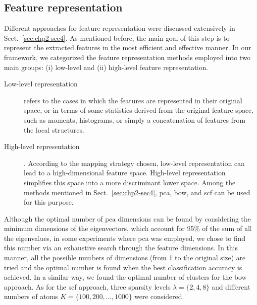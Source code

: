 \subsection{Feature representation}\label{chp3-subsec4}
Different approaches for feature representation were discussed extensively in Sect.~\ref{sec:chp2-sec4}.
As mentioned before, the main goal of this step is to represent the extracted features in the most efficient and effective manner.
In our framework, we categorized the feature representation methods employed into two main groups: (i) low-level and (ii) high-level feature representation.
\begin{description}
\item[Low-level representation] refers to the cases in which the features are represented in their original space, or in terms of some statistics derived from the original feature space, such as moments, histograms, or simply a concatenation of features from the local structures.

\item[High-level representation]. According to the mapping strategy chosen, low-level representation can lead to a high-dimensional feature space.
High-level representation simplifies this space into a more discriminant lower space.
Among the methods mentioned in Sect.~\ref{sec:chp2-sec4}, \ac{pca}, \ac{bow}, and \ac{scf} can be used for this purpose.

\end{description}
Although the optimal number of \ac{pca} dimensions can be found by considering the minimum dimensions of the eigenvectors, which account for 95$\%$ of the sum of all the eigenvalues, in some experiments where \ac{pca} was employed, we chose to find this number via an exhaustive search through the feature dimensions.
In this manner, all the possible numbers of dimensions (from 1 to the original size) are tried and the optimal number is found when the best classification accuracy is achieved.
In a similar way, we found the optimal number of clusters for the \ac{bow} approach.
As for the \ac{scf} approach, three sparsity levels $\lambda = \{2,4,8\}$ and different numbers of atoms $K=\{100,200, ..., 1000\}$ were considered. 
